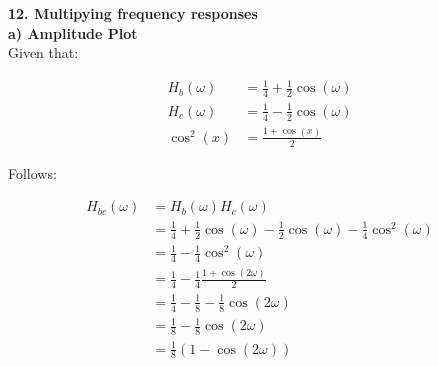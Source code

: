 %
%
%
%
%
%
%
%
%
%


\textbf{\large 12. Multipying frequency responses}
\\

\textbf{a) Amplitude Plot}\\

Given that:

\begin{align}
	H_b(\omega) &= \frac{1}{4} + \frac{1}{2} \cos(\omega) \\
	H_c(\omega) &= \frac{1}{4} - \frac{1}{2} \cos(\omega) \\
	\cos^2(x) &= \frac{1+\cos(x)}{2}
\end{align}

Follows:

\begin{align*}
	H_{bc}(\omega) &= H_b(\omega) H_c(\omega) \\
	&= \frac{1}{4} + \frac{1}{2} \cos(\omega) - \frac{1}{2} \cos(\omega) - \frac{1}{4} \cos^2(\omega)\\
	&= \frac{1}{4} - \frac{1}{4} \cos^2(\omega) \\
	&= \frac{1}{4} - \frac{1}{4} \frac{1+\cos(2\omega)}{2} \\
	&= \frac{1}{4} - \frac{1}{8} - \frac{1}{8}\cos(2\omega) \\
	&= \frac{1}{8} - \frac{1}{8} \cos(2\omega) \\
	&= \frac{1}{8} \left(1 - \cos(2\omega)\right)
\end{align*}

